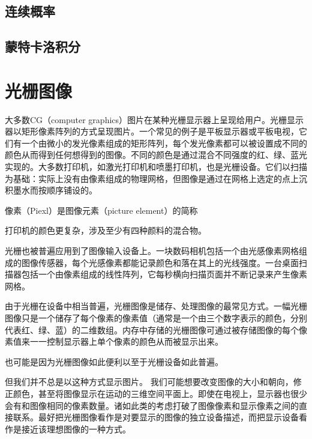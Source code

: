 \documentclass[lang=cn,12pt]{elegantbook}
\begin{document}
\section{连续概率}

\section{蒙特卡洛积分}

\chapter{光栅图像}

大多数CG（computer graphics）图片在某种光栅显示器上呈现给用户。光栅显示器以矩形像素阵列的方式呈现图片。一个常见的例子是平板显示器或平板电视，它们有一个由微小的发光像素组成的矩形阵列，每个发光像素都可以被设置成不同的颜色从而得到任何想得到的图像。不同的颜色是通过混合不同强度的红、绿、蓝光实现的。大多数打印机，如激光打印机和喷墨打印机，也是光栅设备。它们以扫描为基础：实际上没有由像素组成的物理网格，但图像是通过在网格上选定的点上沉积墨水而按顺序铺设的。

\begin{note}
  像素（Piexl）是图像元素（picture element）的简称
\end{note}

\begin{note}
  打印机的颜色更复杂，涉及至少有四种颜料的混合物。
\end{note}

光栅也被普遍应用到了图像输入设备上。一块数码相机包括一个由光感像素网格组成的图像传感器，每个光感像素都能记录颜色和落在其上的光线强度。一台桌面扫描器包括一个由像素组成的线性阵列，它每秒横向扫描页面并不断记录来产生像素网格。

由于光栅在设备中相当普遍，光栅图像是储存、处理图像的最常见方式。一幅光栅图像只是一个储存了每个像素的像素值（通常是一个由三个数字表示的颜色，分别代表红、绿、蓝）的二维数组。内存中存储的光栅图像可通过被存储图像的每个像素值来一一控制显示器上单个像素的颜色从而被显示出来。

\begin{note}
  也可能是因为光栅图像如此便利以至于光栅设备如此普遍。
\end{note}

但我们并不总是以这种方式显示图片。 我们可能想要改变图像的大小和朝向，修正颜色，甚至将图像显示在运动的三维空间平面上。即使在电视上，显示器也很少会有和图像相同的像素数量。诸如此类的考虑打破了图像像素和显示像素之间的直接联系。最好把光栅图像看作是对要显示的图像的独立设备描述，而把显示设备看作是接近该理想图像的一种方式。
\end{document}
